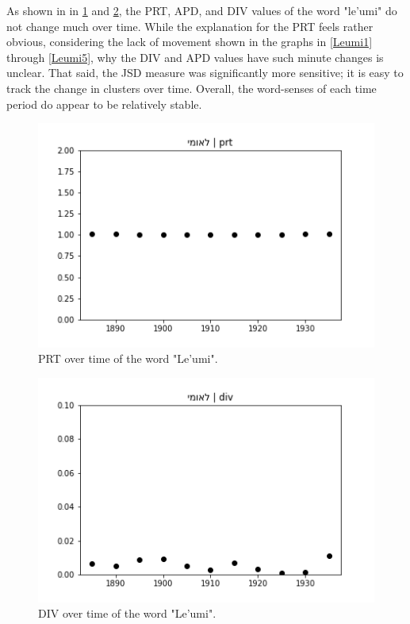 \documentclass[10pt, a4paper]{article}
\begin{document}
As shown in in \ref{fig.1} and \ref{fig.2}, the PRT, APD, and DIV values of the word "le'umi" do not change much over time. While the explanation for the PRT feels rather obvious, considering the lack of movement shown in the graphs in \ref{Leumi1} through \ref{Leumi5}, why the DIV and APD values have such minute changes is unclear. That said, the JSD measure was significantly more sensitive; it is easy to track the change in clusters over time. Overall, the word-senses of each time period do appear to be relatively stable.
\begin{figure}[!h]
\begin{center}
\includegraphics[scale=0.5]{LREC_PAPER/leumi/לאומי_prt.png}
\caption{PRT over time of the word "Le'umi".}
\label{fig.1}
\end{center}
\end{figure}
\begin{figure}[!h]
\begin{center}
\includegraphics[scale=0.5]{LREC_PAPER/leumi/לאומי_div.png}
\caption{DIV over time of the word "Le'umi".}
\label{fig.2}
\end{center}
\end{figure}
\end{document}

